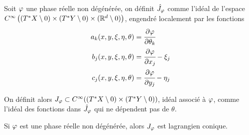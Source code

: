 \begin{defn}
	Soit $\varphi$ une phase réelle non dégénérée, on définit $\hat{J}_\varphi $ comme l'idéal de l'espace $ C^{\infty}\left((T^*X\setminus 0)\times (T^*Y\setminus 0) \times (\mathbb{R}^d \setminus 0)\right)$, engendré localement par les fonctions
	\begin{align*}
		a_k(x,y,\xi,\eta,\theta)&=\cfrac{\partial \varphi}{\partial \theta_k}\\
		b_j(x,y,\xi,\eta,\theta) &= \cfrac{\partial \varphi}{\partial x_j}-\xi_j\\
		c_j(x,y,\xi,\eta,\theta) &= \cfrac{\partial \varphi}{\partial y_j}-\eta_j
	\end{align*}
	
	On définit alors $J_{\varphi}\subset C^{\infty}((T^*X\setminus 0)\times (T^*Y\setminus 0))$, idéal associé à $\varphi$, comme l'idéal des fonctions dans $\hat{J}_{\varphi}$ qui ne dépendent pas de $\theta$.
\end{defn}
\begin{prop}
	Si $\varphi$ est une phase réelle non dégénérée, alors $J_{\varphi}$ est lagrangien conique.
\end{prop}
